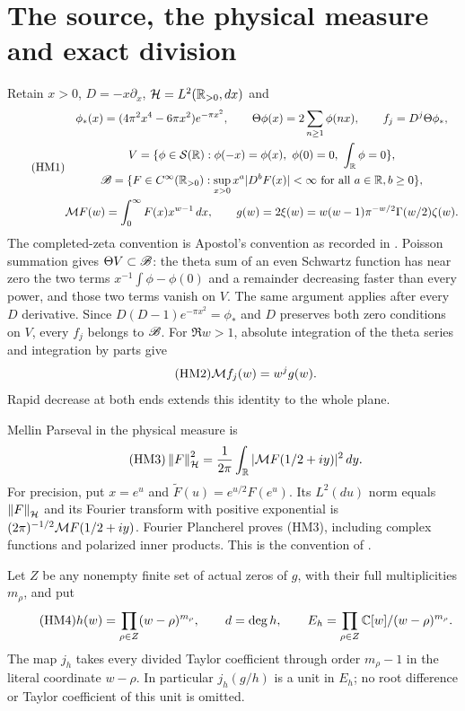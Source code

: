 \documentclass[11pt]{article}
\begin{document}
\section{The source, the physical measure and exact division}
Retain $x>0$, $D=-x\partial_x$, $\mathcal H=L^2(\mathbb R_{>0},dx)$ and
\begin{equation}\tag{HM1}
 \begin{gathered}
 \phi_*(x)=(4\pi^2x^4-6\pi x^2)e^{-\pi x^2},\qquad
 \Theta\phi(x)=2\sum_{n\ge1}\phi(nx),\qquad f_j=D^j\Theta\phi_*,\\
 V=\{\phi\in\mathcal S(\mathbb R):\phi(-x)=\phi(x),\ \phi(0)=0,
                           \ \int_\mathbb R\phi=0\},\\
 \mathscr B=\{F\in C^\infty(\mathbb R_{>0}):
         \sup_{x>0}x^a|D^bF(x)|<\infty\text{ for all }a\in\mathbb R, b\ge0\},\\
 \mathcal M F(w)=\int_0^\infty F(x)x^{w-1}\,dx,\qquad
 g(w)=2\xi(w)=w(w-1)\pi^{-w/2}\Gamma(w/2)\zeta(w).
 \end{gathered}
\end{equation}
The completed-zeta convention is Apostol's convention as recorded in
\cite{hm2:DLMF25}. Poisson summation gives $\Theta V\subset\mathscr B$:
the theta sum of an even Schwartz function has near zero the two terms
$x^{-1}\int\phi-\phi(0)$ and a remainder decreasing faster than every
power, and those two terms vanish on $V$. The same argument applies after
every $D$ derivative. Since $D(D-1)e^{-\pi x^2}=\phi_*$ and $D$ preserves
both zero conditions on $V$, every $f_j$ belongs to $\mathscr B$.
For $\Re w>1$, absolute integration of the theta series and integration
by parts give
\begin{equation}\tag{HM2}
 \mathcal M f_j(w)=w^j g(w).
\end{equation}
Rapid decrease at both ends extends this identity to the whole plane.

Mellin Parseval in the physical measure is
\begin{equation}\tag{HM3}
 \left\lVert F\right\rVert_{\mathcal H}^2=\frac1{2\pi}\int_\mathbb R
                   |\mathcal M F(1/2+iy)|^2\,dy .
\end{equation}
For precision, put $x=e^u$ and $\widetilde F(u)=e^{u/2}F(e^u)$.
Its $L^2(du)$ norm equals $\left\lVert F\right\rVert_{\mathcal H}$ and its Fourier transform
with positive exponential is $(2\pi)^{-1/2}\mathcal M F(1/2+iy)$.
Fourier Plancherel proves (HM3), including complex functions and polarized
inner products. This is the convention of \cite[\S1.14(iv)]{hm2:DLMF1}.

Let $Z$ be any nonempty finite set of actual zeros of $g$, with their
full multiplicities $m_\rho$, and put
\begin{equation}\tag{HM4}
 h(w)=\prod_{\rho\in Z}(w-\rho)^{m_\rho},\qquad d=\deg h,\qquad
 E_h=\prod_{\rho\in Z}\mathbb C[w]/(w-\rho)^{m_\rho}.
\end{equation}
The map $j_h$ takes every divided Taylor coefficient through order
$m_\rho-1$ in the literal coordinate $w-\rho$. In particular
$j_h(g/h)$ is a unit in $E_h$; no root difference or Taylor coefficient
of this unit is omitted.
\end{document}
